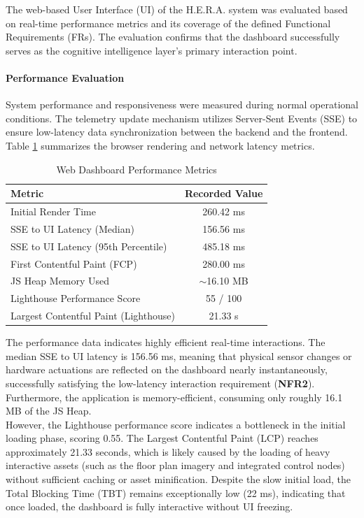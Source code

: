 The web-based User Interface (UI) of the H.E.R.A. system was evaluated based on real-time performance metrics and its coverage of the defined Functional Requirements (FRs). The evaluation confirms that the dashboard successfully serves as the cognitive intelligence layer's primary interaction point.

\paragraph{Performance Evaluation}
System performance and responsiveness were measured during normal operational conditions. The telemetry update mechanism utilizes Server-Sent Events (SSE) to ensure low-latency data synchronization between the backend and the frontend. Table \ref{tab:web_performance} summarizes the browser rendering and network latency metrics.

\begin{table}[H]
\centering
\caption{Web Dashboard Performance Metrics}
\label{tab:web_performance}
\begin{tabular}{lc}
\hline
\textbf{Metric} & \textbf{Recorded Value} \\ \hline
Initial Render Time & 260.42 ms \\
SSE to UI Latency (Median) & 156.56 ms \\
SSE to UI Latency (95th Percentile) & 485.18 ms \\
First Contentful Paint (FCP) & 280.00 ms \\
JS Heap Memory Used & $\sim$16.10 MB \\
Lighthouse Performance Score & 55 / 100 \\ 
Largest Contentful Paint (Lighthouse) & 21.33 s \\ \hline
\end{tabular}
\end{table}

The performance data indicates highly efficient real-time interactions. The median SSE to UI latency is 156.56 ms, meaning that physical sensor changes or hardware actuations are reflected on the dashboard nearly instantaneously, successfully satisfying the low-latency interaction requirement (\textbf{NFR2}). Furthermore, the application is memory-efficient, consuming only roughly 16.1 MB of the JS Heap. \\

However, the Lighthouse performance score indicates a bottleneck in the initial loading phase, scoring 0.55. The Largest Contentful Paint (LCP) reaches approximately 21.33 seconds, which is likely caused by the loading of heavy interactive assets (such as the floor plan imagery and integrated control nodes) without sufficient caching or asset minification. Despite the slow initial load, the Total Blocking Time (TBT) remains exceptionally low (22 ms), indicating that once loaded, the dashboard is fully interactive without UI freezing.

